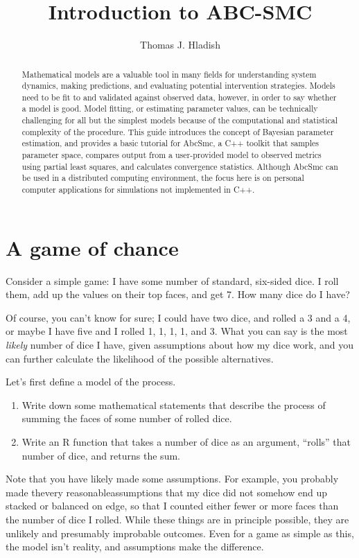 \documentclass[a4paper,10pt]{article}
\title{Introduction to ABC-SMC}
\author{Thomas J. Hladish}
\begin{document}
\maketitle

\begin{abstract}
Mathematical models are a valuable tool in many fields for understanding system dynamics, making predictions, and evaluating potential intervention strategies.  Models need to be fit to and validated against observed data, however, in order to say whether a model is good.  Model fitting, or estimating parameter values, can be technically challenging for all but the simplest models because of the computational and statistical complexity of the procedure.  This guide introduces the concept of Bayesian parameter estimation, and provides a basic tutorial for AbcSmc, a C++ toolkit that samples parameter space, compares output from a user-provided model to observed metrics using partial least squares, and calculates convergence statistics.  Although AbcSmc can be used in a distributed computing environment, the focus here is on personal computer applications for simulations not implemented in C++.


\end{abstract}

\section{A game of chance}
Consider a simple game:  I have some number of standard, six-sided dice.  I roll them, add up the values on their top faces, and get 7.  How many dice do I have?

Of course, you can't know for sure; I could have two dice, and rolled a 3 and a 4, or maybe I have five and I rolled 1, 1, 1, 1, and 3.  What you can say is the most \textit{likely} number of dice I have, given assumptions about how my dice work, and you can further calculate the likelihood of the possible alternatives.

Let's first define a model of the process.
\begin{enumerate}
 \item Write down some mathematical statements that describe the process of summing the faces of some number of rolled dice.
 \item Write an R function that takes a number of dice as an argument, ``rolls'' that number of dice, and returns the sum.
\end{enumerate}

Note that you have likely made some assumptions.  For example, you probably made the\textemdash very reasonable\textemdash assumptions that my dice did not somehow end up stacked or balanced on edge, so that I counted either fewer or more faces than the number of dice I rolled.  While these things are in principle possible, they are unlikely and presumably improbable outcomes.  Even for a game as simple as this, the model isn't reality, and assumptions make the difference.
\end{document}
